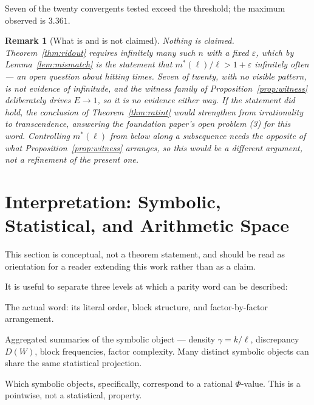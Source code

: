 \documentclass[11pt]{article}
\newtheorem*{remark}{Remark}
\begin{document}
Seven of the twenty convergents tested exceed the threshold; the maximum observed is $3.361$.

\begin{remark}[What is and is not claimed]
Nothing is claimed. Theorem~\ref{thm:ridout} requires infinitely many such $n$ with a \emph{fixed}
$\varepsilon$, which by Lemma~\ref{lem:mismatch} is the statement that
$m^*(\ell)/\ell>1+\varepsilon$ infinitely often --- an open question about hitting times. Seven of
twenty, with no visible pattern, is not evidence of infinitude, and the witness family of
Proposition~\ref{prop:witness} deliberately drives $E\to1$, so it is no evidence either way. If the
statement did hold, the conclusion of Theorem~\ref{thm:ratint} would strengthen from irrationality to
transcendence, answering the foundation paper's open problem (3) for this word. Controlling
$m^*(\ell)$ from \emph{below} along a subsequence needs the opposite of what
Proposition~\ref{prop:witness} arranges, so this would be a different argument, not a refinement of
the present one.
\end{remark}

\section{Interpretation: Symbolic, Statistical, and Arithmetic Space}
\label{sec:interpretation}

This section is conceptual, not a theorem statement, and should be read as orientation for a reader extending this work rather than as a claim.

It is useful to separate three levels at which a parity word can be described:

\begin{description}[leftmargin=2em]
\item[Symbolic space.] The actual word: its literal order, block structure, and factor-by-factor arrangement.
\item[Statistical projection.] Aggregated summaries of the symbolic object --- density $\gamma=k/\ell$, discrepancy $D(W)$, block frequencies, factor complexity. Many distinct symbolic objects can share the same statistical projection.
\item[Arithmetic admissibility.] Which symbolic objects, specifically, correspond to a rational $\Phi$-value. This is a pointwise, not a statistical, property.
\end{description}
\end{document}

